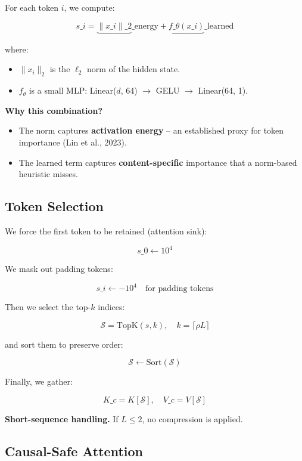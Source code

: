 For each token $i$, we compute:

\[
s\_i = \underbrace{\|x\_i\|\_2}\_{\text{energy}} + \underbrace{f\_\theta(x\_i)}\_{\text{learned}}
\tag{4.1}
\]

where:

\begin{itemize}
\item $\|x_i\|_2$ is the $\ell_2$ norm of the hidden state.
\item $f_\theta$ is a small MLP: Linear($d$, 64) $\to$ GELU $\to$ Linear(64, 1).

\end{itemize}
\textbf{Why this combination?}

\begin{itemize}
\item The norm captures \textbf{activation energy} -- an established proxy for token
  importance (Lin et al., 2023).
\item The learned term captures \textbf{content-specific} importance that a
  norm-based heuristic misses.

\end{itemize}
\subsection{Token Selection}

We force the first token to be retained (attention sink):

\[
s\_0 \leftarrow 10^4
\tag{4.2}
\]

We mask out padding tokens:

\[
s\_i \leftarrow -10^4 \quad \text{for padding tokens}
\tag{4.3}
\]

Then we select the top-$k$ indices:

\[
\mathcal{S} = \text{TopK}(s, k), \quad k = \lceil \rho L \rceil
\tag{4.4}
\]

and sort them to preserve order:

\[
\mathcal{S} \leftarrow \text{Sort}(\mathcal{S})
\tag{4.5}
\]

Finally, we gather:

\[
K\_c = K[\mathcal{S}], \quad V\_c = V[\mathcal{S}]
\tag{4.6}
\]

\textbf{Short-sequence handling.} If $L \leq 2$, no compression is applied.

\subsection{Causal-Safe Attention}

